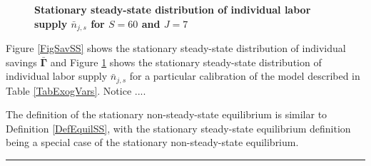 \documentclass[letterpaper,12pt]{article}
\theoremstyle{definition}
\begin{document}
\begin{spacing}{1.5}
    \begin{figure}[htb]\centering \captionsetup{width=4.0in}
      \caption{\label{FigLabSS}\textbf{Stationary steady-state distribution of individual labor supply $\bar{n}_{j,s}$ for $S=60$ and $J=7$}}
    \end{figure}

    Figure \ref{FigSavSS} shows the stationary steady-state distribution of individual savings $\bar{\bm{\Gamma}}$ and Figure \ref{FigLabSS} shows the stationary steady-state distribution of individual labor supply $\bar{n}_{j,s}$ for a particular calibration of the model described in Table \ref{TabExogVars}. Notice .... %

    The definition of the stationary non-steady-state equilibrium is similar to Definition \ref{DefEquilSS}, with the stationary steady-state equilibrium definition being a special case of the stationary non-steady-state equilibrium.

    \vspace{7mm}
    \end{spacing}
    \hrule
\end{document}
